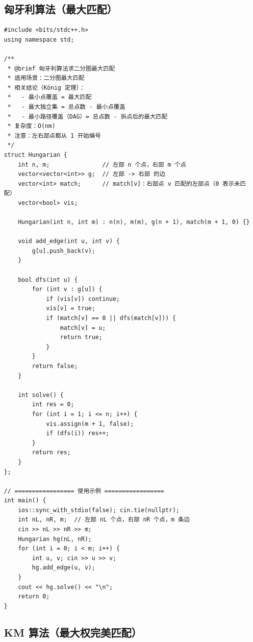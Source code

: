 \subsection{匈牙利算法（最大匹配）}

\begin{lstlisting}
#include <bits/stdc++.h>
using namespace std;

/**
 * @brief 匈牙利算法求二分图最大匹配
 * 适用场景：二分图最大匹配
 * 相关结论（König 定理）：
 *   - 最小点覆盖 = 最大匹配
 *   - 最大独立集 = 总点数 - 最小点覆盖
 *   - 最小路径覆盖（DAG）= 总点数 - 拆点后的最大匹配
 * 复杂度：O(nm)
 * 注意：左右部点都从 1 开始编号
 */
struct Hungarian {
    int n, m;               // 左部 n 个点，右部 m 个点
    vector<vector<int>> g;  // 左部 -> 右部 的边
    vector<int> match;      // match[v]：右部点 v 匹配的左部点（0 表示未匹配）
    vector<bool> vis;

    Hungarian(int n, int m) : n(n), m(m), g(n + 1), match(m + 1, 0) {}

    void add_edge(int u, int v) {
        g[u].push_back(v);
    }

    bool dfs(int u) {
        for (int v : g[u]) {
            if (vis[v]) continue;
            vis[v] = true;
            if (match[v] == 0 || dfs(match[v])) {
                match[v] = u;
                return true;
            }
        }
        return false;
    }

    int solve() {
        int res = 0;
        for (int i = 1; i <= n; i++) {
            vis.assign(m + 1, false);
            if (dfs(i)) res++;
        }
        return res;
    }
};

// ================= 使用示例 =================
int main() {
    ios::sync_with_stdio(false); cin.tie(nullptr);
    int nL, nR, m;  // 左部 nL 个点，右部 nR 个点，m 条边
    cin >> nL >> nR >> m;
    Hungarian hg(nL, nR);
    for (int i = 0; i < m; i++) {
        int u, v; cin >> u >> v;
        hg.add_edge(u, v);
    }
    cout << hg.solve() << "\n";
    return 0;
}
\end{lstlisting}

\subsection{KM 算法（最大权完美匹配）}

